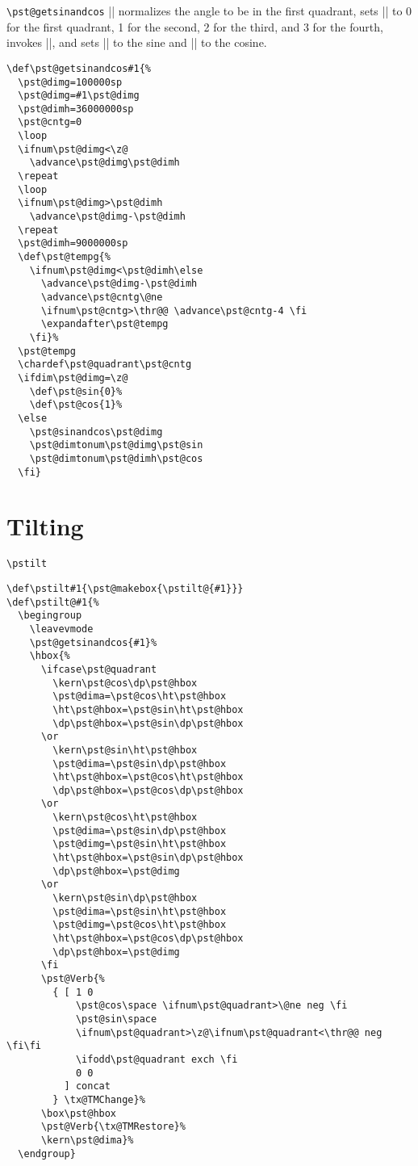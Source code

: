 \documentclass[11pt,english,BCOR10mm,DIV12,bibliography=totoc,parskip=false,smallheadings
    headexclude,footexclude,oneside,dvipsnames,svgnames]{pst-doc}
\begin{document}
 {\verb+\pst@getsinandcos+}
 |\pst@getsinandcos| normalizes the angle to be in the first quadrant, sets
 |\pst@quadrant| to 0 for the first quadrant, 1 for the second, 2 for the
 third, and 3 for the fourth, invokes |\pst@sinandcos|, and sets |\pst@sin|
 to the sine and |\pst@cos| to the cosine.
    \begin{lstlisting}
\def\pst@getsinandcos#1{%
  \pst@dimg=100000sp
  \pst@dimg=#1\pst@dimg
  \pst@dimh=36000000sp
  \pst@cntg=0
  \loop
  \ifnum\pst@dimg<\z@
    \advance\pst@dimg\pst@dimh
  \repeat
  \loop
  \ifnum\pst@dimg>\pst@dimh
    \advance\pst@dimg-\pst@dimh
  \repeat
  \pst@dimh=9000000sp
  \def\pst@tempg{%
    \ifnum\pst@dimg<\pst@dimh\else
      \advance\pst@dimg-\pst@dimh
      \advance\pst@cntg\@ne
      \ifnum\pst@cntg>\thr@@ \advance\pst@cntg-4 \fi
      \expandafter\pst@tempg
    \fi}%
  \pst@tempg
  \chardef\pst@quadrant\pst@cntg
  \ifdim\pst@dimg=\z@
    \def\pst@sin{0}%
    \def\pst@cos{1}%
  \else
    \pst@sinandcos\pst@dimg
    \pst@dimtonum\pst@dimg\pst@sin
    \pst@dimtonum\pst@dimh\pst@cos
  \fi}
    \end{lstlisting}


 \section{Tilting}

 {\verb+\pstilt+}
    \begin{lstlisting}
\def\pstilt#1{\pst@makebox{\pstilt@{#1}}}
\def\pstilt@#1{%
  \begingroup
    \leavevmode
    \pst@getsinandcos{#1}%
    \hbox{%
      \ifcase\pst@quadrant
        \kern\pst@cos\dp\pst@hbox
        \pst@dima=\pst@cos\ht\pst@hbox
        \ht\pst@hbox=\pst@sin\ht\pst@hbox
        \dp\pst@hbox=\pst@sin\dp\pst@hbox
      \or
        \kern\pst@sin\ht\pst@hbox
        \pst@dima=\pst@sin\dp\pst@hbox
        \ht\pst@hbox=\pst@cos\ht\pst@hbox
        \dp\pst@hbox=\pst@cos\dp\pst@hbox
      \or
        \kern\pst@cos\ht\pst@hbox
        \pst@dima=\pst@sin\dp\pst@hbox
        \pst@dimg=\pst@sin\ht\pst@hbox
        \ht\pst@hbox=\pst@sin\dp\pst@hbox
        \dp\pst@hbox=\pst@dimg
      \or
        \kern\pst@sin\dp\pst@hbox
        \pst@dima=\pst@sin\ht\pst@hbox
        \pst@dimg=\pst@cos\ht\pst@hbox
        \ht\pst@hbox=\pst@cos\dp\pst@hbox
        \dp\pst@hbox=\pst@dimg
      \fi
      \pst@Verb{%
        { [ 1 0
            \pst@cos\space \ifnum\pst@quadrant>\@ne neg \fi
            \pst@sin\space
            \ifnum\pst@quadrant>\z@\ifnum\pst@quadrant<\thr@@ neg \fi\fi
            \ifodd\pst@quadrant exch \fi
            0 0
          ] concat
        } \tx@TMChange}%
      \box\pst@hbox
      \pst@Verb{\tx@TMRestore}%
      \kern\pst@dima}%
  \endgroup}
    \end{lstlisting}
\end{document}
